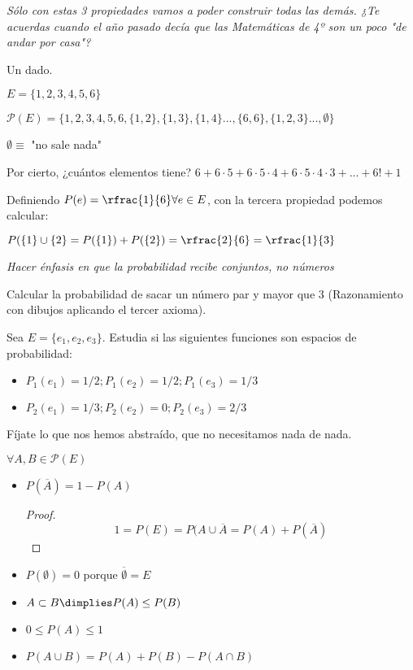 \textit{Sólo con estas 3 propiedades vamos a poder construir todas las demás. ¿Te acuerdas cuando el año pasado decía que las Matem\'aticas de 4º son un poco "de andar por casa"?}

\begin{example} Un dado. 

$E = \{1,2,3,4,5,6\}$

$\mathcal{P}(E) = \{1,2,3,4,5,6,\{1,2\},\{1,3\},\{1,4\} ... , \{6,6\},\{1,2,3\} ..., \emptyset \}$

$\emptyset \equiv$ "no sale nada"

Por cierto, ¿cuántos elementos tiene? $6+6·5+6·5·4+6·5·4·3+... + 6!+1$

Definiendo $P(e) = \rfrac{1}{6} \forall e\in E$, con la tercera propiedad podemos calcular:

$P(\{1\} \cup \{2\} = P(\{1\}) + P(\{2\}) = \rfrac{2}{6} = \rfrac{1}{3}$

\textit{Hacer énfasis en que la probabilidad recibe conjuntos, no números}

Calcular la probabilidad de sacar un número par y mayor que $3$ (Razonamiento con dibujos aplicando el tercer axioma).

\end{example}

\begin{example}
Sea $E=\{e_1,e_2,e_3\}$. Estudia si las siguientes funciones son espacios de probabilidad:

\begin{itemize}
	\item $P_1(e_1) = 1/2 ; P_1(e_2) = 1/2 ; P_1(e_3) = 1/3$
	\item $P_2(e_1) = 1/3 ; P_2(e_2) = 0 ; P_2(e_3) = 2/3$
\end{itemize}

\obs Fíjate lo que nos hemos abstraído, que no necesitamos nada de nada. 
\end{example}

\begin{prop}
$\forall A,B \in \mathcal{P}(E)$
\begin{itemize}
	\item $P(\overline{A}) = 1 - P(A)$
	\begin{proof}
		\[1=P(E) = P(A\cup\overline{A} = P(A) + P(\overline{A})\]
	\end{proof}
	\item $P(\emptyset) = 0$ porque $\overline{\emptyset} = E$
	\item $A\subset B \dimplies P(A) \leq P(B)$
	\item $0\leq P(A)\leq 1$
	\item $P(A\cup B) = P(A) + P(B) - P(A\cap B)$
\end{itemize}
\end{prop}

